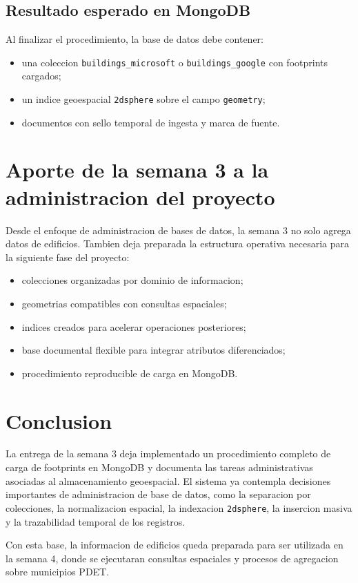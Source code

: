 \documentclass[12pt]{article}
\begin{document}
\subsection{Resultado esperado en MongoDB}

Al finalizar el procedimiento, la base de datos debe contener:

\begin{itemize}[leftmargin=*]
    \item una coleccion \texttt{buildings\_microsoft} o \texttt{buildings\_google} con footprints cargados;
    \item un indice geoespacial \texttt{2dsphere} sobre el campo \texttt{geometry};
    \item documentos con sello temporal de ingesta y marca de fuente.
\end{itemize}

\section{Aporte de la semana 3 a la administracion del proyecto}

Desde el enfoque de administracion de bases de datos, la semana 3 no solo agrega datos de edificios. Tambien deja preparada la estructura operativa necesaria para la siguiente fase del proyecto:

\begin{itemize}[leftmargin=*]
    \item colecciones organizadas por dominio de informacion;
    \item geometrias compatibles con consultas espaciales;
    \item indices creados para acelerar operaciones posteriores;
    \item base documental flexible para integrar atributos diferenciados;
    \item procedimiento reproducible de carga en MongoDB.
\end{itemize}

\section{Conclusion}

La entrega de la semana 3 deja implementado un procedimiento completo de carga de footprints en MongoDB y documenta las tareas administrativas asociadas al almacenamiento geoespacial. El sistema ya contempla decisiones importantes de administracion de base de datos, como la separacion por colecciones, la normalizacion espacial, la indexacion \texttt{2dsphere}, la insercion masiva y la trazabilidad temporal de los registros.

Con esta base, la informacion de edificios queda preparada para ser utilizada en la semana 4, donde se ejecutaran consultas espaciales y procesos de agregacion sobre municipios PDET.
\end{document}
